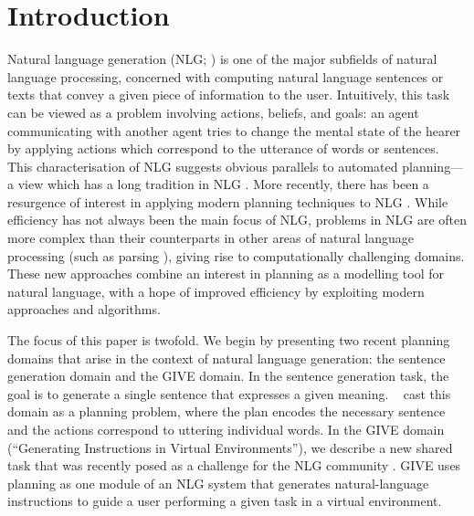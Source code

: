 \section{Introduction}
\label{sec:introduction}

Natural language generation (NLG; \citeauthor{reiter00building}
\citeyear{reiter00building}) is one of the major subfields of natural
language processing, concerned with computing natural language
sentences or texts that convey a given piece of information to the
user. Intuitively, this task can be viewed as a problem involving
actions, beliefs, and goals: an agent communicating with another agent
tries to change the mental state of the hearer by applying actions
which correspond to the utterance of words or sentences. This
characterisation of NLG suggests obvious parallels to automated
planning---a view which has a long tradition in NLG
\cite{appelt:planning,young94dpocl}.  More recently, there has been a
resurgence of interest in applying modern planning techniques to NLG
\cite{Steedman-Petrick:07,KolSto07,benotti08b}.  While efficiency has
not always been the main focus of NLG, problems in NLG are often more
complex than their counterparts in other areas of natural language
processing (such as parsing \cite{KolStr02}), giving rise to
computationally challenging domains. These new approaches combine an
interest in planning as a modelling tool for natural language, with a
hope of improved efficiency by exploiting modern approaches and
algorithms.

The focus of this paper is twofold. We begin by presenting two recent
planning domains that arise in the context of natural language generation:
the sentence generation domain and the GIVE domain. In the sentence
generation task, the goal is to generate a single sentence that expresses a
given meaning. \citeauthor{KolSto07}~ cast this domain
as a planning problem, where the plan encodes the necessary sentence and
the actions correspond to uttering individual words. In the GIVE domain
(``Generating Instructions in Virtual Environments''), we describe a new
shared task that was recently posed as a challenge for the NLG community
\cite{alexander07:_shared_task_propos}. GIVE uses planning as one module of
an NLG system that generates natural-language instructions to guide a
user performing a given task in a virtual environment.

